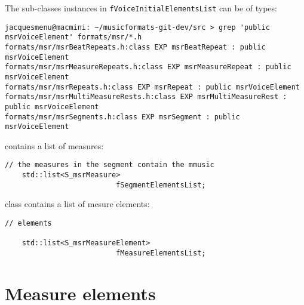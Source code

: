The  sub-classes instances in {\tt fVoiceInitialElementsList} can be of types:
\begin{lstlisting}[language=Terminal]
jacquesmenu@macmini: ~/musicformats-git-dev/src > grep 'public msrVoiceElement' formats/msr/*.h
formats/msr/msrBeatRepeats.h:class EXP msrBeatRepeat : public msrVoiceElement
formats/msr/msrMeasureRepeats.h:class EXP msrMeasureRepeat : public msrVoiceElement
formats/msr/msrRepeats.h:class EXP msrRepeat : public msrVoiceElement
formats/msr/msrMultiMeasureRests.h:class EXP msrMultiMeasureRest : public msrVoiceElement
formats/msr/msrSegments.h:class EXP msrSegment : public msrVoiceElement
\end{lstlisting}

 contains a list of measures:
\begin{lstlisting}[language=CPlusPlus]
    // the measures in the segment contain the mmusic
    std::list<S_msrMeasure>
                          fSegmentElementsList;
\end{lstlisting}

class   {\tt } contains a list of mesure elements:
\begin{lstlisting}[language=CPlusPlus]
    // elements

    std::list<S_msrMeasureElement>
                          fMeasureElementsList;
\end{lstlisting}


\section{Measure elements}

